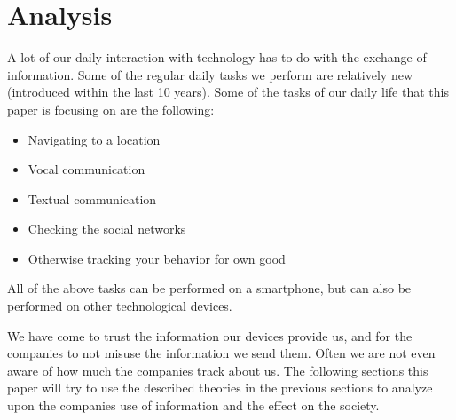 \section{Analysis}
A lot of our daily interaction with technology has to do with the exchange of information. Some of the regular daily tasks we perform are relatively new (introduced within the last 10 years). Some of the tasks of our daily life that this paper is focusing on are the following:
\begin{itemize}
  \item{Navigating to a location}
  \item{Vocal communication}
  \item{Textual communication}
  \item{Checking the social networks}
  \item{Otherwise tracking your behavior for own good}
\end{itemize}

All of the above tasks can be performed on a smartphone, but can also be performed on other technological devices.

We have come to trust the information our devices provide us, and for the companies to not misuse the information we send them. Often we are not even aware of how much the companies track about us. The following sections this paper will try to use the described theories in the previous sections to analyze upon the companies use of information and the effect on the society.
